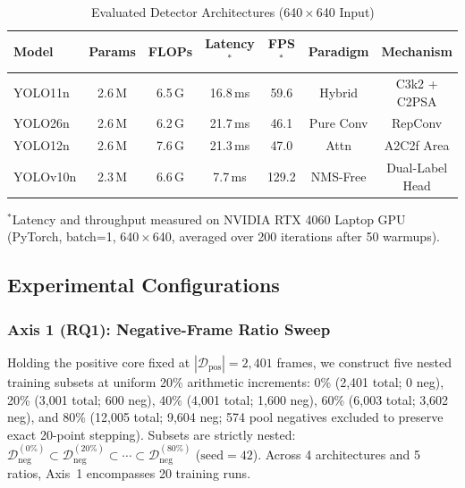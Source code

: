 \documentclass[conference]{IEEEtran}
\begin{document}
\begin{table}[t]
\caption{Evaluated Detector Architectures (640\,$\times$\,640 Input)}
\label{tab:architectures}
\centering
\setlength{\tabcolsep}{1.6pt}
\begin{tabular}{lcccccc}
\toprule
\textbf{Model} & \textbf{Params} & \textbf{FLOPs} & \textbf{Latency$^*$} & \textbf{FPS$^*$} & \textbf{Paradigm} & \textbf{Mechanism} \\
\midrule
YOLO11n  & 2.6\,M & 6.5\,G & 16.8\,ms & 59.6 & Hybrid    & C3k2 + C2PSA \\
YOLO26n  & 2.6\,M & 6.2\,G & 21.7\,ms & 46.1 & Pure Conv & RepConv \\
YOLO12n  & 2.6\,M & 7.6\,G & 21.3\,ms & 47.0 & Attn      & A2C2f Area \\
YOLOv10n & 2.3\,M & 6.6\,G & 7.7\,ms  & 129.2 & NMS-Free & Dual-Label Head \\
\bottomrule
\end{tabular}
\vspace{1pt}
{\footnotesize $^*$Latency and throughput measured on NVIDIA RTX 4060 Laptop GPU (PyTorch, batch=1, 640\,$\times$\,640, averaged over 200 iterations after 50 warmups).}
\end{table}

\subsection{Experimental Configurations}
\label{subsec:configurations}

\subsubsection{Axis 1 (RQ1): Negative-Frame Ratio Sweep}
Holding the positive core fixed at $|\mathcal{D}_{\mathrm{pos}}| = 2{,}401$ frames, we construct five nested training subsets at uniform 20\% arithmetic increments: 0\% (2,401 total; 0 neg), 20\% (3,001 total; 600 neg), 40\% (4,001 total; 1,600 neg), 60\% (6,003 total; 3,602 neg), and 80\% (12,005 total; 9,604 neg; 574 pool negatives excluded to preserve exact 20-point stepping). Subsets are strictly nested: $\mathcal{D}_{\mathrm{neg}}^{(0\%)} \subset \mathcal{D}_{\mathrm{neg}}^{(20\%)} \subset \cdots \subset \mathcal{D}_{\mathrm{neg}}^{(80\%)}$ ($\text{seed}{=}42$). Across 4 architectures and 5 ratios, Axis~1 encompasses 20 training runs.
\end{document}
